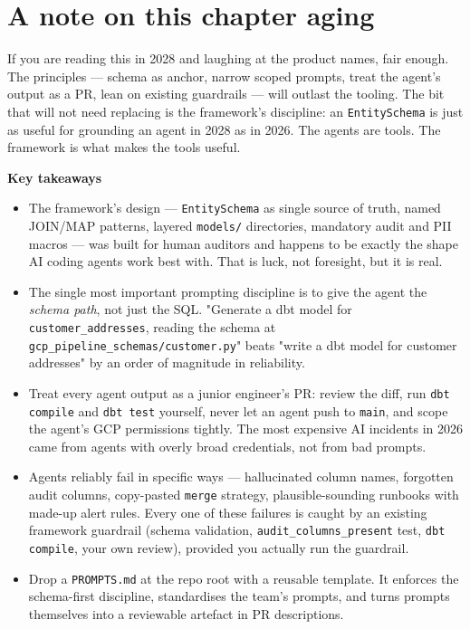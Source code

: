 \documentclass[
  11pt,
  british,
  oneside]{book}
\begin{document}
\hypertarget{a-note-on-this-chapter-aging}{%
\section{A note on this chapter
aging}\label{a-note-on-this-chapter-aging}}

If you are reading this in 2028 and laughing at the product names, fair
enough. The principles --- schema as anchor, narrow scoped prompts,
treat the agent's output as a PR, lean on existing guardrails --- will
outlast the tooling. The bit that will not need replacing is the
framework's discipline: an \texttt{EntitySchema} is just as useful for
grounding an agent in 2028 as in 2026. The agents are tools. The
framework is what makes the tools useful.

\begin{takeaways}
\textbf{Key takeaways}
\begin{itemize}
  \item The framework's design — \texttt{EntitySchema} as single source of truth, named JOIN/MAP patterns, layered \texttt{models/} directories, mandatory audit and PII macros — was built for human auditors and happens to be exactly the shape AI coding agents work best with. That is luck, not foresight, but it is real.
  \item The single most important prompting discipline is to give the agent the \emph{schema path}, not just the SQL. "Generate a dbt model for \texttt{customer\_addresses}, reading the schema at \texttt{gcp\_pipeline\_schemas/customer.py}" beats "write a dbt model for customer addresses" by an order of magnitude in reliability.
  \item Treat every agent output as a junior engineer's PR: review the diff, run \texttt{dbt compile} and \texttt{dbt test} yourself, never let an agent push to \texttt{main}, and scope the agent's GCP permissions tightly. The most expensive AI incidents in 2026 came from agents with overly broad credentials, not from bad prompts.
  \item Agents reliably fail in specific ways — hallucinated column names, forgotten audit columns, copy-pasted \texttt{merge} strategy, plausible-sounding runbooks with made-up alert rules. Every one of these failures is caught by an existing framework guardrail (schema validation, \texttt{audit\_columns\_present} test, \texttt{dbt compile}, your own review), provided you actually run the guardrail.
  \item Drop a \texttt{PROMPTS.md} at the repo root with a reusable template. It enforces the schema-first discipline, standardises the team's prompts, and turns prompts themselves into a reviewable artefact in PR descriptions.
\end{itemize}
\end{takeaways}
\end{document}
